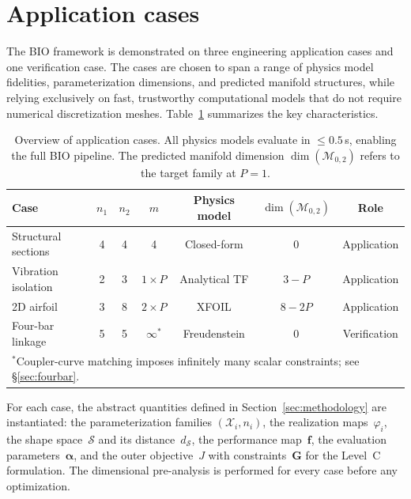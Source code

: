 
\section{Application cases}
\label{sec:applications}

The BIO framework is demonstrated on three engineering application cases and one verification case. The cases are chosen to span a range of physics model fidelities, parameterization dimensions, and predicted manifold structures, while relying exclusively on fast, trustworthy computational models that do not require numerical discretization meshes. Table~\ref{tab:cases_overview} summarizes the key characteristics.

\begin{table}[t]
\centering
\caption{Overview of application cases. All physics models evaluate in $\leq 0.5$\,s, enabling the full BIO pipeline. The predicted manifold dimension $\dim(\mathcal{M}_{0,2})$ refers to the target family at $P = 1$.}
\label{tab:cases_overview}
\small
\begin{tabular}{lcccccc}
\hline
Case & $n_1$ & $n_2$ & $m$ & Physics model & $\dim(\mathcal{M}_{0,2})$ & Role \\
\hline
Structural sections & 4 & 4 & 4 & Closed-form & 0 & Application \\
Vibration isolation  & 2 & 3 & $1 \times P$ & Analytical TF & $3 - P$ & Application \\
2D airfoil           & 3 & 8 & $2 \times P$ & XFOIL & $8 - 2P$ & Application \\
Four-bar linkage     & 5 & 5 & $\infty^*$ & Freudenstein & 0 & Verification \\
\hline
\multicolumn{7}{l}{\footnotesize $^*$Coupler-curve matching imposes infinitely many scalar constraints; see \S\ref{sec:fourbar}.}
\end{tabular}
\end{table}

For each case, the abstract quantities defined in Section~\ref{sec:methodology} are instantiated: the parameterization families $(\mathcal{X}_i, n_i)$, the realization maps~$\varphi_i$, the shape space~$\mathcal{S}$ and its distance~$d_{\mathcal{S}}$, the performance map~$\mathbf{f}$, the evaluation parameters~$\boldsymbol{\alpha}$, and the outer objective~$J$ with constraints~$\mathbf{G}$ for the Level~C formulation. The dimensional pre-analysis is performed for every case before any optimization.


